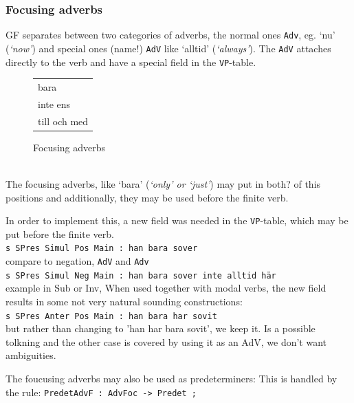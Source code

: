 \documentclass{report}
\begin{document}
\subsubsection{Focusing adverbs}
GF separates between two categories of adverbs, the normal ones \verb-Adv-, 
eg. `nu' (\emph{`now'}) and
special ones (name!) \verb-AdV- like `alltid' (\emph{`always'}).
The \verb-AdV- attaches directly to the verb and have a special
field in the \verb-VP--table.

\begin{figure}
\begin{tabular}{|l|}
\hline
bara \\
inte ens \\
till och med \\
\hline
\end{tabular}
\caption{Focusing adverbs}
\label{fig:focadv}
\end{figure}\\
The focusing adverbs, like `bara' (\emph{`only' or `just'}) may put in both? of this
positions and additionally, they may be used before the finite verb.



In order to implement this, a new field was needed in the \verb-VP--table,
which may be put before the finite verb.\\
\verb|s SPres Simul Pos Main : han bara sover|\\
compare to negation, \verb-AdV- and \verb-Adv-\\
\verb|s SPres Simul Neg Main : han bara sover inte alltid här|\\
example in Sub or Inv, 
When used together with modal verbs, the new field results in
some not very natural sounding constructions:\\
\verb|s SPres Anter Pos Main : han bara har sovit|\\
but rather than changing to 'han har bara sovit', we keep it. Is a possible
tolkning and the other case is covered by using it as an AdV, we don't want
ambiguities.

The foucusing adverbs may also be used as predeterminers:
This is handled by the rule:
\verb|PredetAdvF : AdvFoc -> Predet ;|
\end{document}
